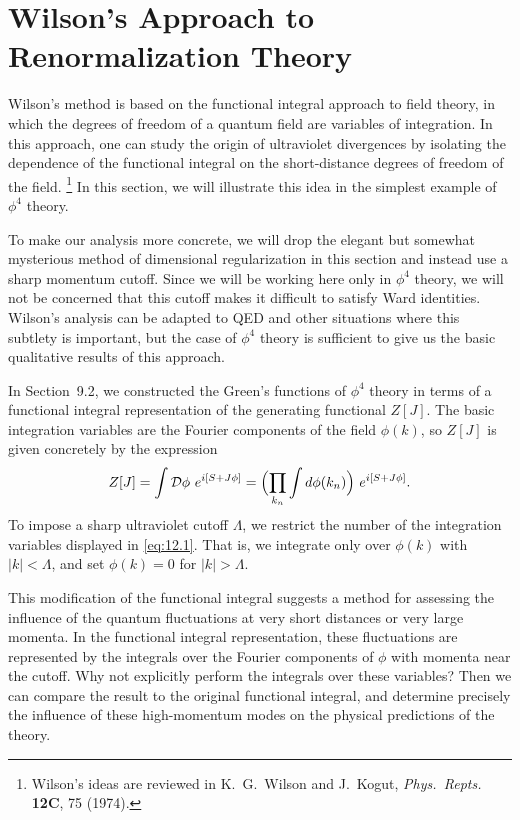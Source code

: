 \section{Wilson's Approach to Renormalization Theory}

Wilson's method is based on the functional integral approach to field theory,
in which the degrees of freedom of a quantum field are variables of
integration.  In this approach, one can study the origin of ultraviolet
divergences by isolating the dependence of the functional integral on the
short-distance degrees of freedom of the field.%
\footnote{Wilson's ideas are reviewed in K.~G.~Wilson and J.~Kogut,
\emph{Phys.\ Repts.} \textbf{12C}, 75 (1974).}  In this section, we will
illustrate this idea in the simplest example of $\phi^4$ theory.

To make our analysis more concrete, we will drop the elegant but somewhat
mysterious method of dimensional regularization in this section and instead
use a sharp momentum cutoff.  Since we will be working here only in $\phi^4$
theory, we will not be concerned that this cutoff makes it difficult to
satisfy Ward identities.  Wilson's analysis can be adapted to QED and other
situations where this subtlety is important, but the case of $\phi^4$ theory
is sufficient to give us the basic qualitative results of this approach.

In Section~9.2, we constructed the Green's functions of $\phi^4$ theory in
terms of a functional integral representation of the generating functional
$Z[J]$.  The basic integration variables are the Fourier components of the
field $\phi(k)$, so $Z[J]$ is given concretely by the expression
\begin{equation}
  Z[J] = \int \mathcal{D}\phi\ e^{i[S+J\phi]}
  = \Bigl( \prod_{k_n} \int d\phi(k_n) \Bigr)\ e^{i[S+J\phi]} .
  \label{eq:12.1}
\end{equation}
To impose a sharp ultraviolet cutoff $\Lambda$, we restrict the number of the
integration variables displayed in \eqref{eq:12.1}.  That is, we integrate
only over $\phi(k)$ with $|k| < \Lambda$, and set $\phi(k) = 0$ for
$|k| > \Lambda$.

This modification of the functional integral suggests a method for assessing
the influence of the quantum fluctuations at very short distances or very
large momenta.  In the functional integral representation, these fluctuations
are represented by the integrals over the Fourier components of $\phi$ with
momenta near the cutoff.  Why not explicitly perform the integrals over these
variables?  Then we can compare the result to the original functional
integral, and determine precisely the influence of these high-momentum modes
on the physical predictions of the theory.

